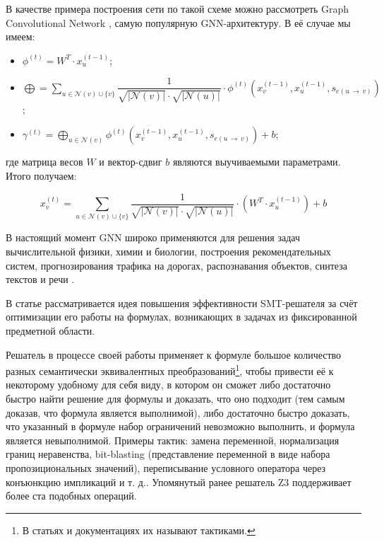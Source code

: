 В качестве примера построения сети по такой схеме можно рассмотреть Graph Convolutional Network \cite{gcn-conv-paper}, самую популярную GNN-архитектуру. В её случае мы имеем:

\begin{itemize}
    \item $\phi^{(t)} = W^T \cdot x_u^{(t - 1)}$;
    \item $\bigoplus = \sum \limits_{u \in \mathcal{N}(v) \cup \{v\}} \dfrac{1}{\sqrt{|\mathcal{N}(v)|} \cdot \sqrt{|\mathcal{N}(u)|}} \cdot \phi^{(t)} \left(x_v^{(t - 1)}, x_u^{(t - 1)}, s_{e(u \, \to \, v)} \right)$;
    \item $\gamma^{(t)} = \bigoplus \limits_{u \in \mathcal{N}(v)} \phi^{(t)} \left(x_v^{(t - 1)}, x_u^{(t - 1)}, s_{e(u \, \to \, v)} \right) + b$;
\end{itemize}

\noindent где матрица весов $W$ и вектор-сдвиг $b$ являются выучиваемыми параметрами. Итого получаем:

\begin{equation}
    x_v^{(t)} = \sum \limits_{u \in \mathcal{N}(v) \cup \{v\}} \dfrac{1}{\sqrt{|\mathcal{N}(v)|} \cdot \sqrt{|\mathcal{N}(u)|}} \cdot \left(W^T \cdot x_u^{(t - 1)} \right) + b
\end{equation}

В настоящий момент GNN широко применяются для решения задач вычислительной физики, химии и биологии, построения рекомендательных систем, прогнозирования трафика на дорогах, распознавания объектов, синтеза текстов и речи \cite{gnn-global-overview} \cite{gnn-deep-learning-5g}.


 \label{fastsmt}

В статье \cite{fastsmt-paper} рассматривается идея повышения эффективности SMT-решателя за счёт оптимизации его работы на формулах, возникающих в задачах из фиксированной предметной области.

Решатель в процессе своей работы применяет к формуле большое количество разных семантически эквивалентных преобразований\footnote{В статьях и документациях их называют тактиками.}, чтобы привести её к некоторому удобному для себя виду, в котором он сможет либо достаточно быстро найти решение для формулы и доказать, что оно подходит (тем самым доказав, что формула является выполнимой), либо достаточно быстро доказать, что указанный в формуле набор ограничений невозможно выполнить, и формула является невыполнимой. Примеры тактик: замена переменной, нормализация границ неравенства, bit-blasting (представление переменной в виде набора пропозициональных значений), переписывание условного оператора через конъюнкцию импликаций и т. д.. Упомянутый ранее решатель Z3 \cite{z3-paper} поддерживает более ста подобных операций.

